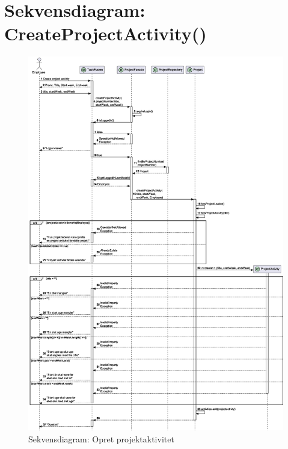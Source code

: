 \newpage
\appendix
\appendixpage
\addappheadtotoc
\section{Sekvensdiagram: CreateProjectActivity()}\label{apdx:seq_create_project_activity}
\begin{figure}[H]
    \centering
    \caption{Sekvensdiagram: Opret projektaktivitet}\label{fig:sequenceCreateProjectActivity}
    \includegraphics[width=.8\textwidth]{RequirementsAndDesign/SequenceDiagrams/seqCreateProjectActivity.eps}
\end{figure}
